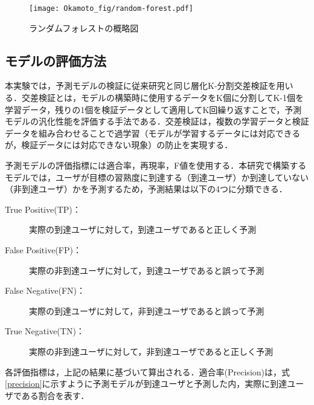 \documentclass[11pt,dvipdfmx]{jreport}
\begin{document}
\begin{figure*}[t]
	\centering
	\texttt{[image: Okamoto\_fig/random-forest.pdf]}
	\caption{ランダムフォレストの概略図}
	\label{fig:random-forest}
\end{figure*}


\subsection{モデルの評価方法}
本実験では，予測モデルの検証に従来研究と同じ層化K-分割交差検証を用いる．交差検証とは，モデルの構築時に使用するデータをK個に分割してK-1個を学習データ，残りの1個を検証データとして適用してK回繰り返すことで，予測モデルの汎化性能を評価する手法である．交差検証は，複数の学習データと検証データを組み合わせることで過学習（モデルが学習するデータには対応できるが，検証データには対応できない現象）の防止を実現する．

予測モデルの評価指標には適合率，再現率，F値を使用する．本研究で構築するモデルでは，ユーザが目標の習熟度に到達する（到達ユーザ）か到達していない（非到達ユーザ）かを予測するため，予測結果は以下の4つに分類できる．

\begin{description}
\item [True Positive(TP)：]実際の到達ユーザに対して，到達ユーザであると正しく予測
\item [False Positive(FP)：]実際の非到達ユーザに対して，到達ユーザであると誤って予測
\item [False Negative(FN)：]実際の到達ユーザに対して，非到達ユーザであると誤って予測
\item [True Negative(TN)：]実際の非到達ユーザに対して，非到達ユーザであると正しく予測
\end{description}

各評価指標は，上記の結果に基づいて算出される．適合率(Precision)は，式\ref{precision}に示すように予測モデルが到達ユーザと予測した内，実際に到達ユーザである割合を表す．
\end{document}
